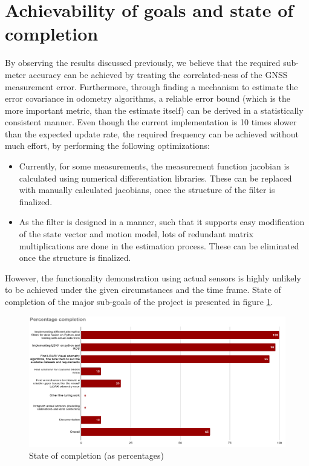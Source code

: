 \section{Achievability of goals and state of completion}
By observing the results discussed previously, we believe that the required sub-meter accuracy can be achieved by treating the correlated-ness of the \gls{GNSS} measurement error. Furthermore, through finding a mechanism to estimate the error covariance in odometry algorithms, a reliable error bound (which is the more important metric, than the estimate itself) can be derived in a statistically consistent manner. Even though the current implementation is 10 times slower than the expected update rate, the required frequency can be achieved without much effort, by performing the following optimizations:
\begin{itemize}
    \item Currently, for some measurements, the measurement function jacobian is calculated using numerical differentiation libraries. These can be replaced with manually calculated jacobians, once the structure of the filter is finalized.
    \item As the filter is designed in a manner, such that it supports easy modification of the state vector and motion model, lots of redundant matrix multiplications are done in the estimation process. These can be eliminated once the structure is finalized.
\end{itemize}
However, the functionality demonstration using actual sensors is highly unlikely to be achieved under the given circumstances and the time frame. State of completion of the major sub-goals of the project is presented in figure \ref{fig:pa:completionState}.
\begin{figure}[t]
	\centering
	\includegraphics[width=\textwidth]{figs/completion_state.png}
	\vspace{-0.5cm}
	\caption{State of completion (as percentages)}
	\label{fig:pa:completionState}
	\vspace{0.5cm}
\end{figure}
